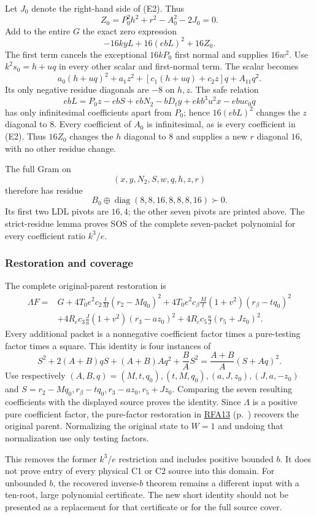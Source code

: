 Let $J_0$ denote the right-hand side of (E2). Thus
\[
Z_0=P_0^2h^2+r^2-A_0^2-2J_0=0.
\]
Add to the entire $G$ the exact zero expression
\[
-16kyL+16(ebL)^2+16Z_0.
\]
The first term cancels the exceptional $16kP_0$ first normal and supplies $16w^2$. Use $k^2s_0=h+uq$ in every other scalar and first-normal term. The scalar becomes
\[
a_0(h+uq)^2+a_1z^2+[c_1(h+uq)+c_2z]q+A_{11}q^2.
\]
Its only negative residue diagonals are $-8$ on $h,z$. The safe relation
\[
ebL=P_0z-ebS+ebN_2-bD_ty+ekb^3u^2x-ebu c_0q
\]
has only infinitesimal coefficients apart from $P_0$; hence $16(ebL)^2$ changes the $z$ diagonal to $8$. Every coefficient of $A_0$ is infinitesimal, as is every coefficient in (E2). Thus $16Z_0$ changes the $h$ diagonal to $8$ and supplies a new $r$ diagonal $16$, with no other residue change.

The full Gram on
\[
\boxed{(x,y,N_2,S,w,q,h,z,r)}
\]
therefore has residue
\[
\boxed{B_0\oplus\operatorname{diag}(8,8,16,8,8,8,16)\succ0.}
\]
Its first two LDL pivots are $16,4$; the other seven pivots are printed above. The strict-residue lemma proves SOS of the complete seven-packet polynomial for every coefficient ratio $k^3/e$.

\subsubsection*{Restoration and coverage}
The complete original-parent restoration is
\begin{align*}
\Lambda F={}&G
+4T_0e^2c_2\frac{t}{M}(r_2-Mq_0)^2
+4T_0e^2c_\beta\frac{M}{t}(1+v^2)(r_\beta-tq_0)^2\\
&+4R_cc_3\frac{J}{a}(1+v^2)(r_3-az_0)^2
+4R_cc_5\frac{a}{J}(r_5+Jz_0)^2.
\end{align*}
Every additional packet is a nonnegative coefficient factor times a pure-testing factor times a square. This identity is four instances of
\[
S^2+2(A+B)qS+(A+B)Aq^2+\frac BA S^2
=\frac{A+B}{A}(S+Aq)^2.
\]
Use respectively $(A,B,q)=(M,t,q_0),(t,M,q_0),(a,J,z_0),(J,a,-z_0)$ and $S=r_2-Mq_0,r_\beta-tq_0,r_3-az_0,r_5+Jz_0$. Comparing the seven resulting coefficients with the displayed source proves the identity. Since $\Lambda$ is a positive pure coefficient factor, the pure-factor restoration in \hyperref[component:p9b00698ff36a]{RFA13} (p.~\pageref{component:p9b00698ff36a}) recovers the original parent. Normalizing the original state to $W=1$ and undoing that normalization use only testing factors.

This removes the former $k^3/e$ restriction and includes positive bounded $b$. It does not prove entry of every physical C1 or C2 source into this domain. For unbounded $b$, the recovered inverse-$b$ theorem remains a different input with a ten-root, large polynomial certificate. The new short identity should not be presented as a replacement for that certificate or for the full source cover.


